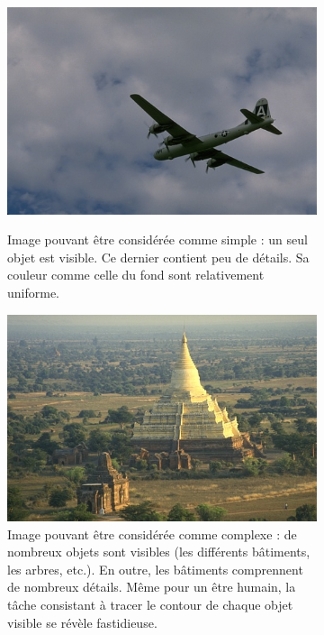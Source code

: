 \begin{figure}[htb]
	\centering
	
	 \begin{subfigure}[B]{0.45\textwidth}	
			\includegraphics[width=\textwidth]{images/sur-segmentation/im_simple}
		  \caption{Image pouvant être considérée comme simple : un seul objet est visible. Ce dernier contient peu de détails.  Sa couleur comme celle du fond sont relativement uniforme.}
			\includegraphics[width=\textwidth]{images/sur-segmentation/im_complexe}
		 \caption{Image pouvant être considérée comme complexe : de nombreux objets sont visibles (les différents bâtiments, les arbres, etc.). En outre, les bâtiments comprennent de nombreux détails. Même pour un être humain, la tâche consistant à tracer le contour de chaque objet visible se révèle fastidieuse. }
	\end{subfigure}		
	~	
	\begin{subfigure}[T]{0.45\textwidth}	

\end{subfigure}
\end{figure}
